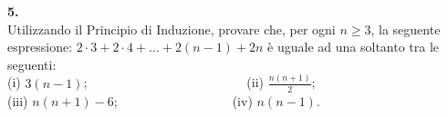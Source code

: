 \documentclass[italian,a4paper,11pt]
{article}
\begin{document}
\vspace{0.4cm}
\noindent
\begin{Ex}\textbf{ 5.}\\
Utilizzando il Principio di Induzione, provare che, per ogni $n\geq3$, la seguente espressione:
$2\cdot3+2\cdot4+\ldots+2(n-1)+2n$
\`e uguale ad una soltanto tra le seguenti:\\
(i) $3(n-1)$;\ \ \ \ \ \ \ \ \ \ \ \ \ \ \ \ \ \ \ \ \ \ \ \ \ (ii) $\frac{n(n+1)}{2}$; \\
(iii)  $n(n+1)-6$;\ \ \ \ \ \ \ \ \ \ \ \ \ \ \ \ \ \ (iv)  $n(n-1)$.
\end{Ex}
\end{document}
